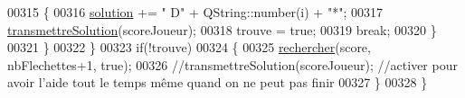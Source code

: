 \begin{DoxyCode}
00315             \{
00316                 \hyperlink{class_solution_a03b47dedfe8a8f8244f7e633cbaa30fb}{solution} += \textcolor{stringliteral}{" D"} + QString::number(i) + \textcolor{stringliteral}{"*"};
00317                 \hyperlink{class_solution_a334ffddf70bd379a0af7c7e93750d6b5}{transmettreSolution}(scoreJoueur);
00318                 trouve = \textcolor{keyword}{true};
00319                 \textcolor{keywordflow}{break};
00320             \}
00321         \}
00322     \}
00323     \textcolor{keywordflow}{if}(!trouve)
00324     \{
00325         \hyperlink{class_solution_a857b1b362fc0d5eb08e2eb7302dce27f}{rechercher}(score, nbFlechettes+1, \textcolor{keyword}{true});
00326         \textcolor{comment}{//transmettreSolution(scoreJoueur);       //activer pour avoir l'aide tout le temps même quand on
       ne peut pas finir}
00327     \}
00328 \}
\end{DoxyCode}
